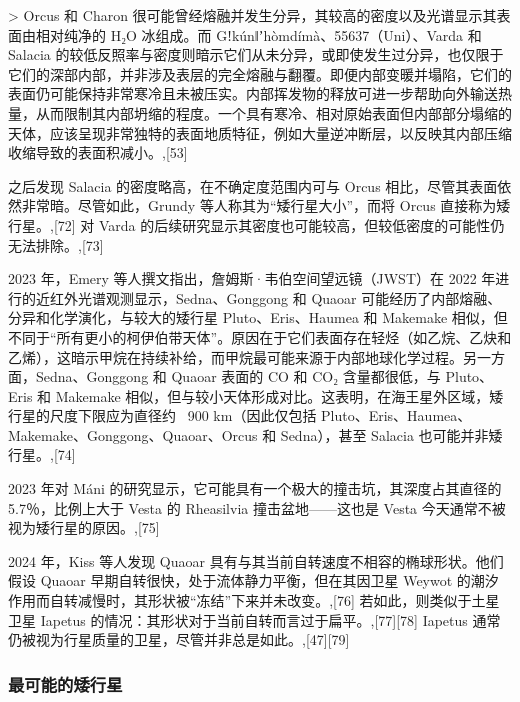> Orcus 和 Charon 很可能曾经熔融并发生分异，其较高的密度以及光谱显示其表面由相对纯净的 H₂O 冰组成。而 Gǃkúnǁʼhòmdímà、55637（Uni）、Varda 和 Salacia 的较低反照率与密度则暗示它们从未分异，或即使发生过分异，也仅限于它们的深部内部，并非涉及表层的完全熔融与翻覆。即便内部变暖并塌陷，它们的表面仍可能保持非常寒冷且未被压实。内部挥发物的释放可进一步帮助向外输送热量，从而限制其内部坍缩的程度。一个具有寒冷、相对原始表面但内部部分塌缩的天体，应该呈现非常独特的表面地质特征，例如大量逆冲断层，以反映其内部压缩收缩导致的表面积减小。,[53]

之后发现 Salacia 的密度略高，在不确定度范围内可与 Orcus 相比，尽管其表面依然非常暗。尽管如此，Grundy 等人称其为“矮行星大小”，而将 Orcus 直接称为矮行星。,[72] 对 Varda 的后续研究显示其密度也可能较高，但较低密度的可能性仍无法排除。,[73]

2023 年，Emery 等人撰文指出，詹姆斯·韦伯空间望远镜（JWST）在 2022 年进行的近红外光谱观测显示，Sedna、Gonggong 和 Quaoar 可能经历了内部熔融、分异和化学演化，与较大的矮行星 Pluto、Eris、Haumea 和 Makemake 相似，但不同于“所有更小的柯伊伯带天体”。原因在于它们表面存在轻烃（如乙烷、乙炔和乙烯），这暗示甲烷在持续补给，而甲烷最可能来源于内部地球化学过程。另一方面，Sedna、Gonggong 和 Quaoar 表面的 CO 和 CO₂ 含量都很低，与 Pluto、Eris 和 Makemake 相似，但与较小天体形成对比。这表明，在海王星外区域，矮行星的尺度下限应为直径约 ~900 km（因此仅包括 Pluto、Eris、Haumea、Makemake、Gonggong、Quaoar、Orcus 和 Sedna），甚至 Salacia 也可能并非矮行星。,[74]

2023 年对 Máni 的研究显示，它可能具有一个极大的撞击坑，其深度占其直径的 5.7％，比例上大于 Vesta 的 Rheasilvia 撞击盆地——这也是 Vesta 今天通常不被视为矮行星的原因。,[75]

2024 年，Kiss 等人发现 Quaoar 具有与其当前自转速度不相容的椭球形状。他们假设 Quaoar 早期自转很快，处于流体静力平衡，但在其因卫星 Weywot 的潮汐作用而自转减慢时，其形状被“冻结”下来并未改变。,[76] 若如此，则类似于土星卫星 Iapetus 的情况：其形状对于当前自转而言过于扁平。,[77][78] Iapetus 通常仍被视为行星质量的卫星，尽管并非总是如此。,[47][79]
\subsubsection{最可能的矮行星}


